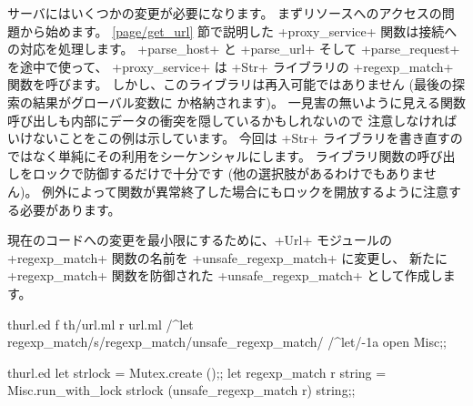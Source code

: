 \http サーバにはいくつかの変更が必要になります。
まずリソースへのアクセスの問題から始めます。
\ref{page/get_url} 節で説明した \ml+proxy_service+ 関数は接続への対応を処理します。
\ml+parse_host+ と \ml+parse_url+ そして \ml+parse_request+ を途中で使って、
\ml+proxy_service+ は \ml+Str+ ライブラリの \ml+regexp_match+ 関数を呼びます。
しかし、このライブラリは再入可能ではありません (最後の探索の結果がグローバル変数に
か格納されます)。
一見害の無いように見える関数呼び出しも内部にデータの衝突を隠しているかもしれないので
注意しなければいけないことをこの例は示しています。
今回は \ml+Str+ ライブラリを書き直すのではなく単純にその利用をシーケンシャルにします。
ライブラリ関数の呼び出しをロックで防御するだけで十分です (他の選択肢があるわけでもありません)。
例外によって関数が異常終了した場合にもロックを開放するように注意する必要があります。

現在のコードへの変更を最小限にするために、\ml+Url+ モジュールの
\ml+regexp_match+ 関数の名前を \ml+unsafe_regexp_match+ に変更し、
新たに \ml+regexp_match+ 関数を防御された \ml+unsafe_regexp_match+ として作成します。
%
\begin{codefile}{thurl.ed}
f th/url.ml
r url.ml
/^let regexp_match/s/regexp_match/unsafe_regexp_match/
/^let/-1a
open Misc;;
\end{codefile}
%
\begin{listingcodefile}{thurl.ed}
let strlock = Mutex.create ();;
let regexp_match r string =
  Misc.run_with_lock strlock (unsafe_regexp_match r) string;;
\end{listingcodefile}

